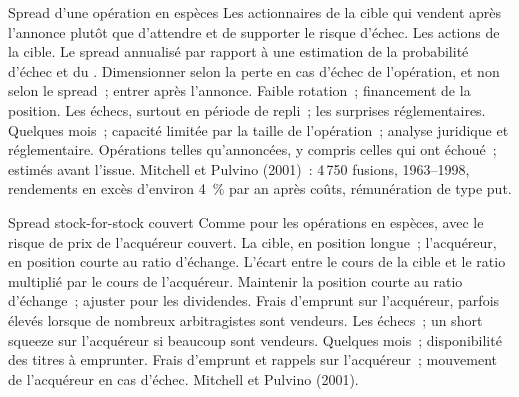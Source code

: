 \begin{strategyfile}{Spread d'une opération en espèces}\label{strat:s1:merger-arbitrage:cash}
 Les actionnaires de la cible qui vendent après l'annonce plutôt que d'attendre et de supporter le risque d'échec.
 Les actions de la cible.
 Le spread annualisé par rapport à une estimation de la probabilité d'échec et du .
 Dimensionner selon la perte en cas d'échec de l'opération, et non selon le spread~; entrer après l'annonce.
 Faible rotation~; financement de la position.
 Les échecs, surtout en période de repli~; les surprises réglementaires.
 Quelques mois~; capacité limitée par la taille de l'opération~; analyse juridique et réglementaire.
 Opérations telles qu'annoncées, y compris celles qui ont échoué~;  estimés avant l'issue.
 Mitchell et Pulvino (2001)~: 4\,750 fusions, 1963--1998, rendements en excès d'environ 4~\% par an après coûts, rémunération de type put.
\end{strategyfile}

\begin{strategyfile}{Spread stock-for-stock couvert}\label{strat:s1:merger-arbitrage:stock}
 Comme pour les opérations en espèces, avec le risque de prix de l'acquéreur couvert.
 La cible, en position longue~; l'acquéreur, en position courte au ratio d'échange.
 L'écart entre le cours de la cible et le ratio multiplié par le cours de l'acquéreur.
 Maintenir la position courte au ratio d'échange~; ajuster pour les dividendes.
 Frais d'emprunt sur l'acquéreur, parfois élevés lorsque de nombreux arbitragistes sont vendeurs.
 Les échecs~; un short squeeze sur l'acquéreur si beaucoup sont vendeurs.
 Quelques mois~; disponibilité des titres à emprunter.
 Frais d'emprunt et rappels sur l'acquéreur~; mouvement de l'acquéreur en cas d'échec.
 Mitchell et Pulvino (2001).
\end{strategyfile}

